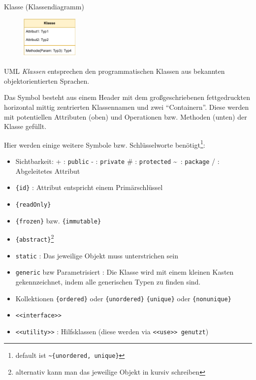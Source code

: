 \begin{defi}{Klasse (Klassendiagramm)}
    \begin{figure}
        \centering
        \includegraphics[width=0.25\textwidth]{includes/figures/defi_diagrams_class_intro.pdf}
    \end{figure}
    UML \emph{Klassen} entsprechen den programmatischen Klassen aus bekannten objektorientierten Sprachen.

    Das Symbol besteht aus einem Header mit dem großgeschriebenen fettgedruckten horizontal mittig zentrierten Klassennamen und zwei \enquote{Containern}.
    Diese werden mit potentiellen Attributen (oben) und Operationen bzw. Methoden (unten) der Klasse gefüllt.

    Hier werden einige weitere Symbole bzw. Schlüsselworte benötigt\footnote{default ist \texttt{\textasciitilde \{unordered, unique\}}}:
    \begin{itemize}
        \item Sichtbarkeit:
              \subitem + : \texttt{public}
              \subitem - : \texttt{private}
              \subitem \# : \texttt{protected}
              \subitem \textasciitilde\ : \texttt{package}
              \subitem / : Abgeleitetes Attribut
        \item \texttt{\{id\}} : Attribut entspricht einem Primärschlüssel
        \item \texttt{\{readOnly\}}
        \item \texttt{\{frozen\}} bzw. \texttt{\{immutable\}}
        \item \texttt{\{abstract\}}\footnote{alternativ kann man das jeweilige Objekt in kursiv schreiben}
        \item \texttt{static} : Das jeweilige Objekt muss unterstrichen sein
        \item \texttt{generic} bzw Parametrisiert : Die Klasse wird mit einem kleinen Kasten gekennzeichnet, indem alle generischen Typen zu finden sind.
        \item Kollektionen
              \subitem \texttt{\{ordered\}} oder \texttt{\{unordered\}}
              \subitem \texttt{\{unique\}} oder \texttt{\{nonunique\}}
        \item \texttt{<<interface>>}
        \item \texttt{<<utility>>} : Hilfsklassen (diese werden via \texttt{<<use>> genutzt})
    \end{itemize}
\end{defi}

